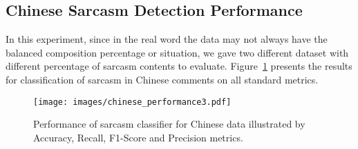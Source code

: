 \documentclass[12pt,a4paper]{report}
\theoremstyle{definition}
\begin{document}
\begin{CJK}{UTF8}{bsmi}
        \subsection{Chinese Sarcasm Detection Performance}
        \par In this experiment, since in the real word the data may not always have the balanced composition percentage or situation, we gave two different dataset with different percentage of sarcasm contents to evaluate.
        Figure~\ref{fig:ch_performance} presents the results for classification of sarcasm in Chinese comments on all standard metrics. %
        \begin{center}
        \begin{figure}[H]
            \texttt{[image: images/chinese\_performance3.pdf]}
            \caption{Performance of sarcasm classifier for Chinese data illustrated by Accuracy, Recall, F1-Score and Precision metrics.}
            \label{fig:ch_performance}
        \end{figure}
        \end{center}

\end{CJK}
\end{document}
